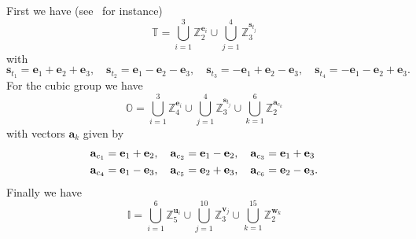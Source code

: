 \documentclass[11pt,a4paper]{amsart}
\theoremstyle{definition}
\newcommand{\ZZ}{\mathbb{Z}}                %
\newcommand{\octa}{\mathbb{O}}              %
\newcommand{\ico}{\mathbb{I}}               %
\newcommand{\tetra}{\mathbb{T}}             %
\newcommand{\DD}{\mathbb{D}}                %
\newcommand{\1}{\mathds{1}}		            %
\newcommand{\ee}{\pmb{e}}                   %
\newcommand{\uu}{\pmb{u}}                   %
\newcommand{\vv}{\pmb{v}}                   %
\newcommand{\be}{\mathbf{e}}
\newcommand{\ba}{\mathbf{a}}
\begin{document}
First we have (see~\cite{Ihrig1984} for instance)
\begin{equation}\label{eq:Decomposition_tetra}
  \tetra=\bigcup_{i=1}^3\ZZ_2^{\ee_i}\cup\bigcup_{j=1}^4 \ZZ_3^{\pmb{s}_{t_j}}
\end{equation}
with
\begin{equation*}
  \pmb{s}_{t_1}=\ee_1+\ee_2+\ee_3,\quad \pmb{s}_{t_2}=\ee_1-\ee_2-\ee_3,\quad \pmb{s}_{t_3}=-\ee_1+\ee_2-\ee_3,\quad \pmb{s}_{t_4}=-\ee_1-\ee_2+\ee_3.
\end{equation*}
For the cubic group we have
\begin{equation}\label{eq:Decomposition_Cube}
  \octa=\bigcup_{i=1}^3 \ZZ_4^{\ee_i}\cup\bigcup_{j=1}^4 \ZZ_3^{\pmb{s}_{t_j}}\cup\bigcup_{k=1}^6\ZZ_2^{\pmb{a}_{c_k}}
\end{equation}
with vectors $\ba_k$ given by
\begin{align}\label{eq:Vecteurs_ak_Ordre2_Cube}
  \ba_{c_1} & =\be_1+\be_2,\quad \ba_{c_2}=\be_1-\be_2,\quad \ba_{c_3}=\be_1+\be_3  \\ \notag
  \ba_{c_4} & =\be_1-\be_3,\quad \ba_{c_5}=\be_2+\be_3,\quad \ba_{c_6}=\be_2-\be_3.
\end{align}
Finally we have
\begin{equation}\label{eq:Decomposition_Ico}
  \ico=\bigcup_{i=1}^6 \ZZ_5^{\uu_i}\cup\bigcup_{j=1}^{10} \ZZ_3^{\vv_j}\cup\bigcup_{k=1}^{15}\ZZ_2^{\pmb{w}_k}%
\end{equation}
\end{document}
